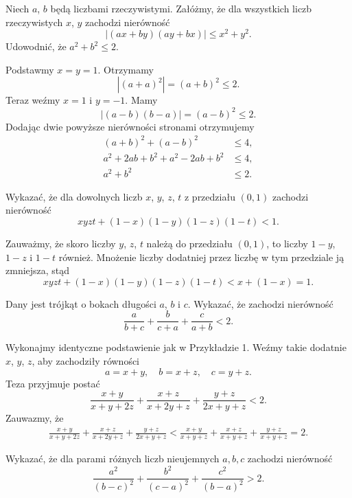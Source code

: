 \newpage
{}
\begin{problem}{1}
	Niech $a$, $b$ będą liczbami rzeczywistymi. Załóżmy, że dla wszystkich liczb rzeczywistych $x$, $y$ zachodzi nierówność
	\[
		|(ax + by)(ay + bx)| \leqslant x^2 + y^2.
	\]
	Udowodnić, że $a^2 + b^2 \leqslant 2$.
\end{problem}

\noindent
Podstawmy $x = y = 1$. Otrzymamy
\[
	|(a + a)^2| = (a + b)^2 \leqslant 2.
\]
Teraz weźmy $x = 1$ i $y = -1$. Mamy
\[
	|(a - b)(b - a)| = (a - b)^2 \leqslant 2.
\]
Dodając dwie powyższe nierówności stronami otrzymujemy
\begin{align*}
	(a + b)^2 + (a - b)^2 &\leqslant 4, \\
	a^2 + 2ab + b^2 + a^2 - 2ab + b^2 &\leqslant 4, \\
	a^2 + b^2 &\leqslant 2.
\end{align*}

\begin{problem}{2}
Wykazać, że dla dowolnych liczb $x$, $y$, $z$, $t$ z przedziału $(0, 1)$ zachodzi nierówność
\[
	xyzt + (1 - x)(1 - y)(1 - z)(1 - t) < 1.
\]
\end{problem}

\noindent
Zauważmy, że skoro liczby $y$, $z$, $t$ należą do przedziału $(0, 1)$, to liczby $1 - y$, $1 - z$ i $1 - t$ również. Mnożenie liczby dodatniej przez liczbę w tym przedziale ją zmniejsza, stąd
\[
	xyzt + (1 - x)(1 - y)(1 - z)(1 - t) < x + (1 - x) = 1.
\]

\begin{problem}{3}
Dany jest trójkąt o bokach długości $a$, $b$ i $c$. Wykazać, że zachodzi nierówność
\[
	\frac{a}{b + c} + \frac{b}{c + a} + \frac{c}{a + b} < 2.
\]
\end{problem}

\noindent
Wykonajmy identyczne podstawienie jak w Przykładzie 1. Weźmy takie dodatnie $x$, $y$, $z$, aby zachodziły równości
\[
	a = x + y, \quad b = x + z, \quad c = y + z.
\]
Teza przyjmuje postać
\[
	\frac{x + y}{x + y + 2z} + \frac{x + z}{x + 2y + z} + \frac{y + z}{2x + y + z} < 2.
\]
Zauwazmy, że
\begin{align*}
	\frac{x + y}{x + y + 2z} + \frac{x + z}{x + 2y + z} + \frac{y + z}{2x + y + z} < \frac{x + y}{x + y + z} + \frac{x + z}{x + y + z} + \frac{y + z}{x + y + z} = 2.
\end{align*}

\begin{problem}{4}
Wykazać, że dla parami różnych liczb nieujemnych $a,b,c$ zachodzi nierówność
\[
	\frac{a^2}{(b - c)^2} + \frac{b^2}{(c - a)^2} + \frac{c^2}{(b - a)^2} > 2.
\]
\end{problem}

